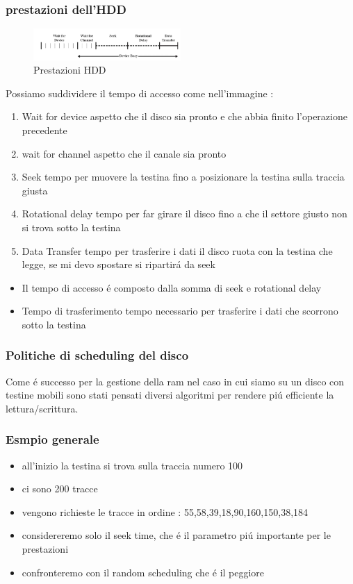 \subsubsection*{prestazioni dell'HDD}
\begin{figure}[H]
    \centering
    \includegraphics[width=0.5\textwidth]{immagini/tempodiaccessoadisco}
    \caption{Prestazioni HDD}
\end{figure}
Possiamo suddividere il tempo di accesso come nell'immagine :
\begin{enumerate}
    \item Wait for device aspetto che il disco sia pronto e che abbia finito l'operazione precedente
    \item wait for channel aspetto che il canale sia pronto
    \item Seek tempo per muovere la testina fino a posizionare la testina sulla traccia giusta
    \item Rotational delay tempo per far girare il disco fino a che il settore giusto non si trova sotto la testina
    \item Data Transfer tempo per trasferire i dati il disco ruota con la testina che legge, se mi devo spostare si ripartirá da seek
\end{enumerate}
\begin{itemize}
    \item Il tempo di accesso é composto dalla somma di seek e rotational delay
    \item Tempo di trasferimento tempo necessario per trasferire i dati che scorrono sotto la testina
\end{itemize}
\subsubsection*{Politiche di scheduling del disco}
Come é successo per la gestione della ram nel caso in cui siamo su un disco con testine mobili sono stati pensati diversi
algoritmi per rendere piú efficiente la lettura/scrittura.
\subsubsection*{Esmpio generale}
\begin{itemize}
    \item all'inizio la testina si trova sulla traccia numero 100
    \item ci sono 200 tracce
    \item vengono richieste le tracce in ordine : 55,58,39,18,90,160,150,38,184
    \item considereremo solo il seek time, che é il parametro piú importante per le prestazioni
    \item confronteremo con il random scheduling che é il peggiore
\end{itemize}
